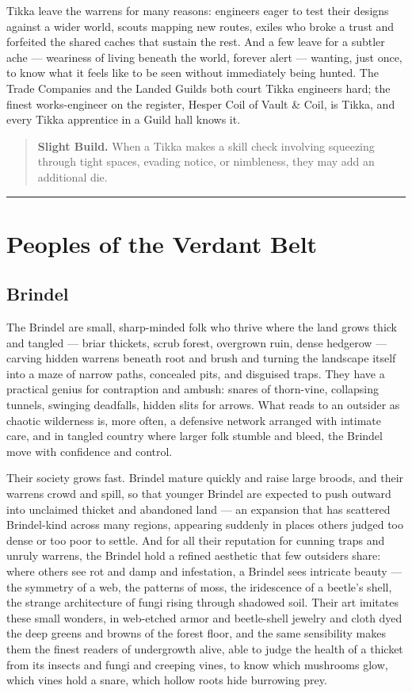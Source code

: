 Tikka leave the warrens for many reasons: engineers eager to test their designs against a wider world, scouts mapping new routes, exiles who broke a trust and forfeited the shared caches that sustain the rest. And a few leave for a subtler ache --- weariness of living beneath the world, forever alert --- wanting, just once, to know what it feels like to be seen without immediately being hunted. The Trade Companies and the Landed Guilds both court Tikka engineers hard; the finest works-engineer on the register, Hesper Coil of Vault \& Coil, is Tikka, and every Tikka apprentice in a Guild hall knows it.

\begin{quote}
\textbf{Slight Build.} When a Tikka makes a skill check involving squeezing through tight spaces, evading notice, or nimbleness, they may add an additional die.
\end{quote}

\bigskip
\hrule
\bigskip

\section{Peoples of the Verdant Belt}

\subsection{Brindel}

The Brindel are small, sharp-minded folk who thrive where the land grows thick and tangled --- briar thickets, scrub forest, overgrown ruin, dense hedgerow --- carving hidden warrens beneath root and brush and turning the landscape itself into a maze of narrow paths, concealed pits, and disguised traps. They have a practical genius for contraption and ambush: snares of thorn-vine, collapsing tunnels, swinging deadfalls, hidden slits for arrows. What reads to an outsider as chaotic wilderness is, more often, a defensive network arranged with intimate care, and in tangled country where larger folk stumble and bleed, the Brindel move with confidence and control.

Their society grows fast. Brindel mature quickly and raise large broods, and their warrens crowd and spill, so that younger Brindel are expected to push outward into unclaimed thicket and abandoned land --- an expansion that has scattered Brindel-kind across many regions, appearing suddenly in places others judged too dense or too poor to settle. And for all their reputation for cunning traps and unruly warrens, the Brindel hold a refined aesthetic that few outsiders share: where others see rot and damp and infestation, a Brindel sees intricate beauty --- the symmetry of a web, the patterns of moss, the iridescence of a beetle's shell, the strange architecture of fungi rising through shadowed soil. Their art imitates these small wonders, in web-etched armor and beetle-shell jewelry and cloth dyed the deep greens and browns of the forest floor, and the same sensibility makes them the finest readers of undergrowth alive, able to judge the health of a thicket from its insects and fungi and creeping vines, to know which mushrooms glow, which vines hold a snare, which hollow roots hide burrowing prey.


